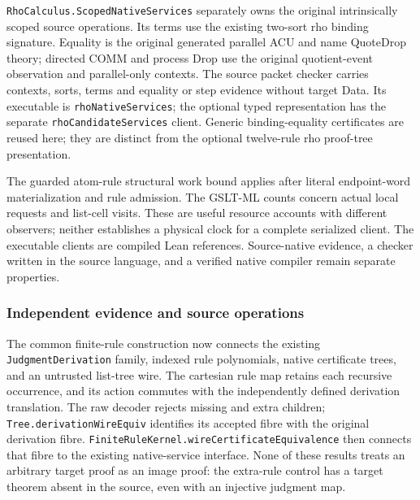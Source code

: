 \documentclass[11pt]{article}
\newcommand{\code}[1]{\nolinkurl{#1}}
\begin{document}
\code{RhoCalculus.ScopedNativeServices} separately owns the original
intrinsically scoped source operations. Its terms use the existing two-sort
rho binding signature. Equality is the original generated parallel ACU and
name QuoteDrop theory; directed COMM and process Drop use the original
quotient-event observation and parallel-only contexts. The source packet
checker carries contexts, sorts, terms and equality or step evidence without
target Data. Its executable is \code{rhoNativeServices}; the optional typed
representation has the separate \code{rhoCandidateServices} client. Generic
binding-equality certificates are reused here; they are distinct from the
optional twelve-rule rho proof-tree presentation.

The guarded atom-rule structural work bound applies after literal endpoint-word
materialization and rule admission. The GSLT-ML counts concern actual local
requests and list-cell visits. These are useful resource accounts with
different observers; neither establishes a physical clock for a complete
serialized client. The executable clients are compiled Lean references.
Source-native evidence, a checker written in the source language, and a
verified native compiler remain separate properties.

\subsubsection{Independent evidence and source operations}
The common finite-rule construction now connects the existing
\code{JudgmentDerivation} family, indexed rule polynomials, native certificate
trees, and an untrusted list-tree wire. The cartesian rule map retains each
recursive occurrence, and its action commutes with the independently defined
derivation translation. The raw decoder rejects missing and extra children;
\code{Tree.derivationWireEquiv} identifies its accepted fibre with the original
derivation fibre. \code{FiniteRuleKernel.wireCertificateEquivalence} then
connects that fibre to the existing native-service interface. None of these
results treats an arbitrary target proof as an image proof: the extra-rule
control has a target theorem absent in the source, even with an injective
judgment map.
\end{document}
